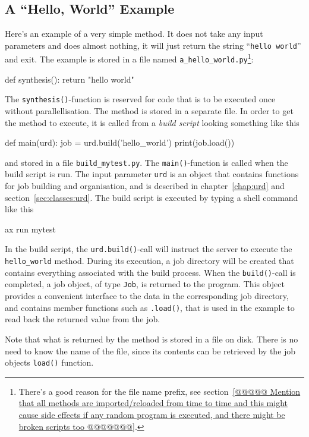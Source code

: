 \subsection{A ``Hello, World'' Example}
Here's an example of a very simple method.  It does not take any input
parameters and does almost nothing, it will just return the string
``\texttt{hello world}'' and exit.  The example is stored in a file
named \texttt{a\_hello\_world.py}\footnote{There's a good reason for
the file name prefix, see section~\ref{@@@@@ Mention that all methods are imported/reloaded from time to time and this might cause side effects if any random program is executed, and there might be broken scripts too @@@@@@@}.}:
\begin{python}
def synthesis():
    return "hello world"
\end{python}
The \texttt{synthesis()}-function is reserved for code that is to be
executed once without parallellisation.  The method is stored in a
separate file.  In order to get the method to execute, it is called
from a \textsl{build script} looking something like this
\begin{python}
def main(urd):
    job = urd.build('hello_world')
    print(job.load())
\end{python}
and stored in a file \texttt{build\_mytest.py}.  The
\texttt{main()}-function is called when the build script is run.  The
input parameter \texttt{urd} is an object that contains functions for
job building and organisation, and is described in
chapter~\ref{chap:urd} and section~\ref{sec:classes:urd}.  The build
script is executed by typing a shell command like this
\begin{shell}
ax run mytest
\end{shell}
In the build script, the \texttt{urd.build()}-call will instruct the
server to execute the \texttt{hello\_world} method.  During
its execution, a job directory will be created that contains
everything associated with the build process.  When the
\texttt{build()}-call is completed, a job object, of type
\texttt{Job}, is returned to the program.  This object provides a
convenient interface to the data in the corresponding job directory,
and contains member functions such as \texttt{.load()}, that is used
in the example to read back the returned value from the job.

Note that what is returned by the method is stored in a file on disk.
There is no need to know the name of the file, since its contents can
be retrieved by the job objects \texttt{load()} function.



